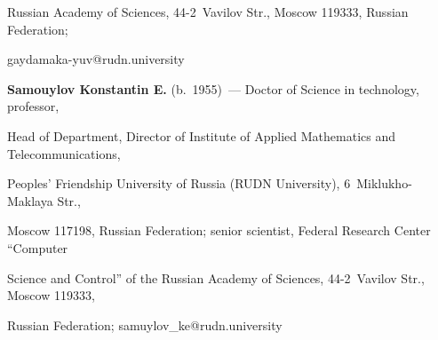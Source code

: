 Russian Academy of Sciences, 44-2~Vavilov Str., Moscow 119333, Russian Federation; 


\mbox{gaydamaka-yuv@rudn.university}


\vspace*{3pt}





\noindent


\textbf{Samouylov Konstantin E.} (b.\ 1955)~--- Doctor of Science in technology, professor, 


Head of Department, Director of Institute of Applied Mathematics and Telecommunications, 


Peoples' Friendship University of Russia (RUDN University), 6~Miklukho-Maklaya Str., 


Moscow 117198, Russian Federation; senior scientist, Federal Research Center ``Computer 


Science and Control'' of the Russian Academy of Sciences, 44-2~Vavilov Str., Moscow 119333, 


Russian Federation; \mbox{samuylov\_ke@rudn.university}


\label{end\stat}








\renewcommand{\bibname}{\protect\rm Литература}


